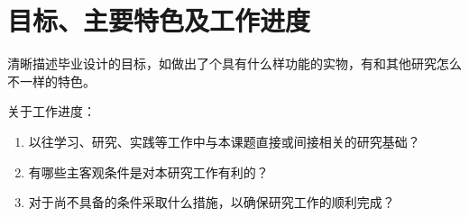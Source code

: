 %
%
%
%

\section{目标、主要特色及工作进度}
清晰描述毕业设计的目标，如做出了个具有什么样功能的实物，有和其他研究怎么不一样的特色。

关于工作进度：
\begin{enumerate}[label=\arabic*)]
    \item 以往学习、研究、实践等工作中与本课题直接或间接相关的研究基础？
    \item 有哪些主客观条件是对本研究工作有利的？
    \item 对于尚不具备的条件采取什么措施，以确保研究工作的顺利完成？
\end{enumerate}

